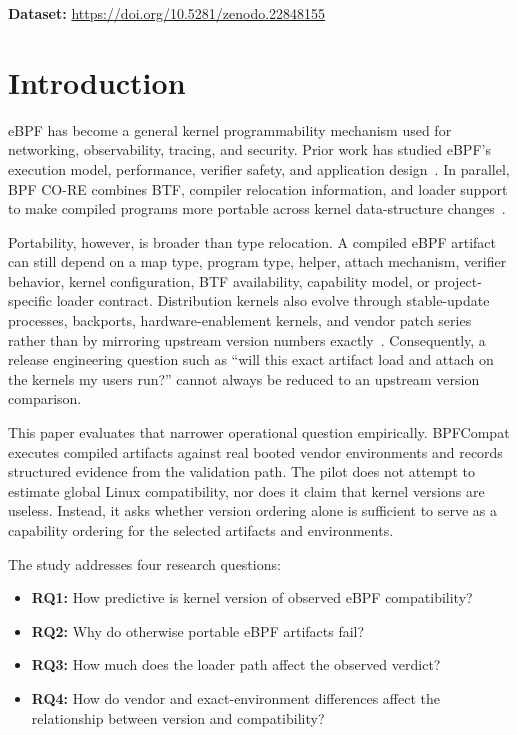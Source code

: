 \documentclass[10pt]{article}
\begin{document}
\noindent\textbf{Dataset:} \url{https://doi.org/10.5281/zenodo.22848155}

\section{Introduction}
eBPF has become a general kernel programmability mechanism used for networking, observability, tracing, and security. Prior work has studied eBPF's execution model, performance, verifier safety, and application design~\cite{vieira2020ebpfxdp,gershuni2019verifier}. In parallel, BPF CO-RE combines BTF, compiler relocation information, and loader support to make compiled programs more portable across kernel data-structure changes~\cite{linux_libbpf_overview,linux_btf,linux_bpf_docs,nakryiko2020core}.

Portability, however, is broader than type relocation. A compiled eBPF artifact can still depend on a map type, program type, helper, attach mechanism, verifier behavior, kernel configuration, BTF availability, capability model, or project-specific loader contract. Distribution kernels also evolve through stable-update processes, backports, hardware-enablement kernels, and vendor patch series rather than by mirroring upstream version numbers exactly~\cite{ubuntu_kernel_sru,linux_backporting,linux_stable_rules}. Consequently, a release engineering question such as ``will this exact artifact load and attach on the kernels my users run?'' cannot always be reduced to an upstream version comparison.

This paper evaluates that narrower operational question empirically. BPFCompat executes compiled artifacts against real booted vendor environments and records structured evidence from the validation path. The pilot does not attempt to estimate global Linux compatibility, nor does it claim that kernel versions are useless. Instead, it asks whether version ordering alone is sufficient to serve as a capability ordering for the selected artifacts and environments.

The study addresses four research questions:
\begin{itemize}
  \item \textbf{RQ1:} How predictive is kernel version of observed eBPF compatibility?
  \item \textbf{RQ2:} Why do otherwise portable eBPF artifacts fail?
  \item \textbf{RQ3:} How much does the loader path affect the observed verdict?
  \item \textbf{RQ4:} How do vendor and exact-environment differences affect the relationship between version and compatibility?
\end{itemize}
\end{document}
